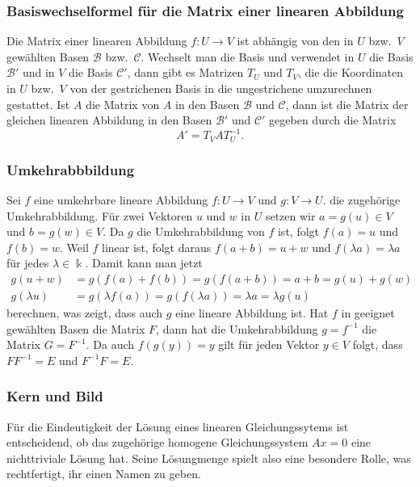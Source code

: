 \subsubsection{Basiswechselformel für die Matrix einer linearen Abbildung}
Die Matrix einer linearen Abbildung $f\colon U\to V$ ist abhängig von den
in $U$ bzw.~$V$ gewählten Basen $\mathcal{B}$ bzw.~$\mathcal{C}$.
Wechselt man die Basis und verwendet in $U$ die Basis $\mathcal{B}'$ und
in $V$ die Basis $\mathcal{C}'$, dann gibt es Matrizen
$T_U$ und $T_V$, die die Koordinaten in $U$ bzw.~$V$ von der gestrichenen
Basis in die ungestrichene umzurechnen gestattet.
Ist $A$ die Matrix von $A$ in den Basen $\mathcal{B}$ und $\mathcal{C}$,
dann ist die Matrix der gleichen linearen Abbildung in den Basen $\mathcal{B}'$
und $\mathcal{C}'$ gegeben durch die Matrix
\begin{equation}
A' = T_VAT_U^{-1}.
\label{buch:vektoren-und-matrizen:eqn:basiswechselabb}
\end{equation}

\subsubsection{Umkehrabbbildung}
Sei $f$ eine umkehrbare lineare Abbildung $f\colon U\to V$ und $g\colon V\to U$.
die zugehörige Umkehrabbildung.
%
Für zwei Vektoren $u$ und $w$ in $U$ setzen wir $a=g(u)\in V$
und $b=g(w)\in V$.
Da $g$ die Umkehrabbildung von $f$ ist, folgt $f(a)=u$ und $f(b)=w$.
Weil $f$ linear ist, folgt daraus
$f(a+b)=u+w$ und $f(\lambda a)=\lambda a$
für jedes $\lambda\in\Bbbk$.
Damit kann man jetzt
\begin{align*}
g(u+w)&=g(f(a)+f(b)) = g(f(a+b)) = a+b = g(u)+g(w)
\\
g(\lambda u) &= g(\lambda f(a))=g(f(\lambda a)) = \lambda a = \lambda g(u)
\end{align*}
berechnen, was zeigt, dass auch $g$ eine lineare Abbildung ist.
Hat $f$ in geeignet gewählten Basen die Matrix $F$, dann hat die
Umkehrabbildung $g=f^{-1}$ die Matrix $G=F^{-1}$.
Da auch $f(g(y))=y$ gilt für jeden Vektor $y\in V$ folgt, dass $FF^{-1}=E$
und $F^{-1}F=E$.

\subsubsection{Kern und Bild}
Für die Eindeutigkeit der Lösung eines linearen Gleichungssytems
ist entscheidend, ob das zugehörige homogene Gleichungssystem $Ax=0$
eine nichttriviale Lösung hat.
Seine Lösungmenge spielt also eine besondere Rolle, was rechtfertigt,
ihr einen Namen zu geben.

